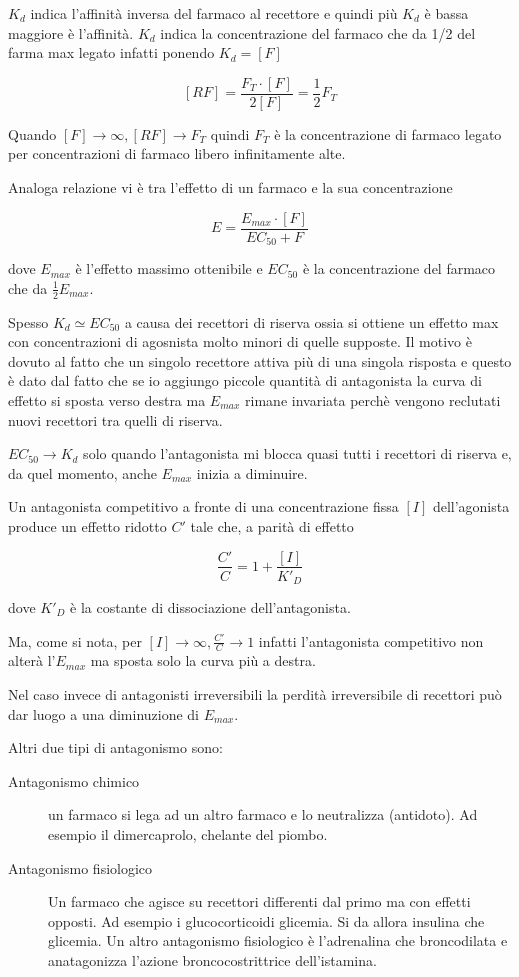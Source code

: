 $K_d$ indica l'affinità inversa del farmaco al recettore e quindi più $K_d$ è bassa maggiore è l'affinità. $K_d$ indica la concentrazione del farmaco che da 1/2 del farma max legato infatti ponendo $K_d =[F]$

$$ [RF] = \frac{F_T\cdot[F]}{2[F]}=\frac 12 F_T$$

Quando $[F]\rightarrow\infty, [RF] \rightarrow F_T$ quindi $F_T$ è la concentrazione di farmaco legato per concentrazioni di farmaco libero infinitamente alte.

Analoga relazione vi è tra l'effetto di un farmaco e la sua concentrazione

$$E =\frac{E_{max}\cdot[F]}{EC_{50} + F}$$

dove $E_{max}$ è l'effetto massimo ottenibile e $EC_{50}$ è la concentrazione del farmaco che da $\frac12 E_{max}$.

Spesso $K_d\simeq EC_{50}$ a causa dei recettori di riserva ossia si ottiene un effetto max con concentrazioni di agosnista molto minori di quelle supposte. Il motivo è dovuto al fatto che un singolo recettore attiva più di una singola risposta e questo è dato dal fatto che se io aggiungo piccole quantità di antagonista la curva di effetto si sposta verso destra ma $E_{max}$ rimane invariata perchè vengono reclutati nuovi recettori tra quelli di riserva. 

$EC_{50} \rightarrow K_d$ solo quando l'antagonista mi blocca quasi tutti i recettori di riserva e, da quel momento, anche $E_{max}$ inizia a diminuire.

Un antagonista competitivo a fronte di una concentrazione fissa $[I]$ dell'agonista produce un effetto ridotto $C'$ tale che, a parità di effetto

$$\frac{C'}{C} = 1+ \frac{[I]}{K'_D}$$

dove $K'_D$ è la costante di dissociazione dell'antagonista. 

Ma, come si nota, per $[I]\rightarrow\infty, \frac{C'}{C}\rightarrow 1$ infatti l'antagonista competitivo non alterà l'$E_{max}$ ma sposta solo la curva più a destra.

Nel caso invece di antagonisti irreversibili la perdità irreversibile di recettori può dar luogo a una diminuzione di $E_{max}$.

Altri due tipi di antagonismo sono:

\begin{description}
\item[Antagonismo chimico] un farmaco si lega ad un altro farmaco e lo neutralizza (antidoto). Ad esempio il dimercaprolo, chelante del piombo.
\item[Antagonismo fisiologico] Un farmaco che agisce su recettori differenti dal primo ma con effetti opposti. Ad esempio i glucocorticoidi \upa glicemia. Si da allora insulina che \dwa glicemia. Un altro antagonismo fisiologico è l'adrenalina che broncodilata e anatagonizza l'azione broncocostrittrice dell'istamina.
\end{description}

